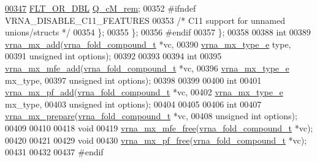 \begin{DoxyCode}
\mbox{\hyperlink{group__dp__matrices_a6f6bad095f31114e990d68af46d2eda5}{00347}}   \mbox{\hyperlink{group__data__structures_ga31125aeace516926bf7f251f759b6126}{FLT\_OR\_DBL}} \mbox{\hyperlink{group__dp__matrices_a6f6bad095f31114e990d68af46d2eda5}{Q\_cM\_rem}};
00352 \textcolor{preprocessor}{#ifndef VRNA\_DISABLE\_C11\_FEATURES}
00353   \textcolor{comment}{/* C11 support for unnamed unions/structs */}
00354 \};
00355 \};
00356 \textcolor{preprocessor}{#endif}
00357 \};
00358 
00388 \textcolor{keywordtype}{int}
00389 \mbox{\hyperlink{group__dp__matrices_ga08661f098008961dab0023bf300f0c33}{vrna\_mx\_add}}(\mbox{\hyperlink{group__fold__compound_structvrna__fc__s}{vrna\_fold\_compound\_t}}  *vc,
00390             \mbox{\hyperlink{group__dp__matrices_ga6042ea1d58d01931e959791be6d89343}{vrna\_mx\_type\_e}}        type,
00391             \textcolor{keywordtype}{unsigned} \textcolor{keywordtype}{int}          options);
00392 
00393 
00394 \textcolor{keywordtype}{int}
00395 \mbox{\hyperlink{group__dp__matrices_ga0b29f2a8a5632879014a80d51b334374}{vrna\_mx\_mfe\_add}}(\mbox{\hyperlink{group__fold__compound_structvrna__fc__s}{vrna\_fold\_compound\_t}}  *vc,
00396                 \mbox{\hyperlink{group__dp__matrices_ga6042ea1d58d01931e959791be6d89343}{vrna\_mx\_type\_e}}        mx\_type,
00397                 \textcolor{keywordtype}{unsigned} \textcolor{keywordtype}{int}          options);
00398 
00399 
00400 \textcolor{keywordtype}{int}
00401 \mbox{\hyperlink{group__dp__matrices_gaf80ade1ec97fc158875736e69eff999f}{vrna\_mx\_pf\_add}}(\mbox{\hyperlink{group__fold__compound_structvrna__fc__s}{vrna\_fold\_compound\_t}} *vc,
00402                \mbox{\hyperlink{group__dp__matrices_ga6042ea1d58d01931e959791be6d89343}{vrna\_mx\_type\_e}}       mx\_type,
00403                \textcolor{keywordtype}{unsigned} \textcolor{keywordtype}{int}         options);
00404 
00405 
00406 \textcolor{keywordtype}{int}
00407 \mbox{\hyperlink{group__dp__matrices_ga35e1fa4fdab869abb14f06ba5a3ba5b4}{vrna\_mx\_prepare}}(\mbox{\hyperlink{group__fold__compound_structvrna__fc__s}{vrna\_fold\_compound\_t}}  *vc,
00408                 \textcolor{keywordtype}{unsigned} \textcolor{keywordtype}{int}          options);
00409 
00410 
00418 \textcolor{keywordtype}{void}
00419 \mbox{\hyperlink{group__dp__matrices_ga6a9422feb5dfe5c64050cebf447672d0}{vrna\_mx\_mfe\_free}}(\mbox{\hyperlink{group__fold__compound_structvrna__fc__s}{vrna\_fold\_compound\_t}} *vc);
00420 
00421 
00429 \textcolor{keywordtype}{void}
00430 \mbox{\hyperlink{group__dp__matrices_ga2283e69fd139fb8e58d7ade3b5773f9c}{vrna\_mx\_pf\_free}}(\mbox{\hyperlink{group__fold__compound_structvrna__fc__s}{vrna\_fold\_compound\_t}} *vc);
00431 
00432 
00437 \textcolor{preprocessor}{#endif}
\end{DoxyCode}
